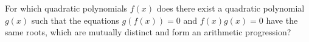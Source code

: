 For which quadratic polynomials $f(x)$ does there exist a quadratic polynomial $g(x)$ such that the equations $g(f(x)) = 0$ and $f(x)g(x) = 0$ have the same roots, which are mutually distinct and form an arithmetic progression?
